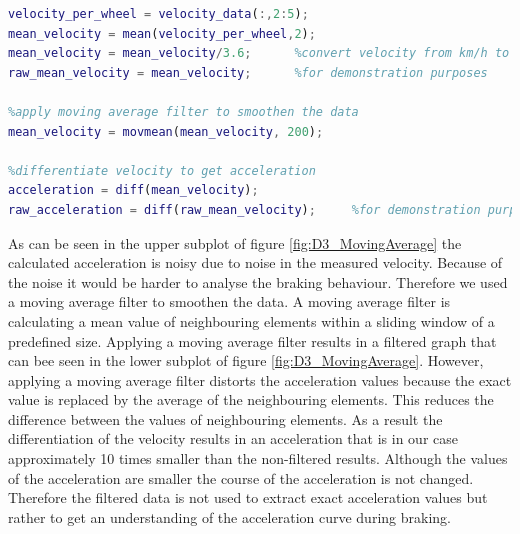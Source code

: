 \begin{lstlisting}[language=Matlab,basicstyle=\scriptsize	,caption= Preprocessing measurement data,label= lst:D3Preprocess]
%compute mean velocity of all 4 wheels
velocity_per_wheel = velocity_data(:,2:5);
mean_velocity = mean(velocity_per_wheel,2);
mean_velocity = mean_velocity/3.6;      %convert velocity from km/h to m/s
raw_mean_velocity = mean_velocity;      %for demonstration purposes

%apply moving average filter to smoothen the data
mean_velocity = movmean(mean_velocity, 200); 

%differentiate velocity to get acceleration
acceleration = diff(mean_velocity);
raw_acceleration = diff(raw_mean_velocity);     %for demonstration purposes
\end{lstlisting}

As can be seen in the upper subplot of figure \ref{fig:D3_MovingAverage} the calculated acceleration is noisy due to noise in the measured velocity.
Because of the noise it would be harder to analyse the braking behaviour. Therefore we used a moving average filter to smoothen the data.
A moving average filter is calculating a mean value of neighbouring elements within a sliding window of a predefined size.
Applying a moving average filter results in a filtered graph that can bee seen in the lower subplot of figure \ref{fig:D3_MovingAverage}. 
However, applying a moving average filter distorts the acceleration values because the exact value is replaced by the average of the neighbouring elements. This reduces the difference between the values of neighbouring elements.
As a result the differentiation of the velocity results in an acceleration that is in our case approximately 10 times smaller than the non-filtered results.
Although the values of the acceleration are smaller the course of the acceleration is not changed.
Therefore the filtered data is not used to extract exact acceleration values but rather to get an understanding of the acceleration curve during braking.\\

